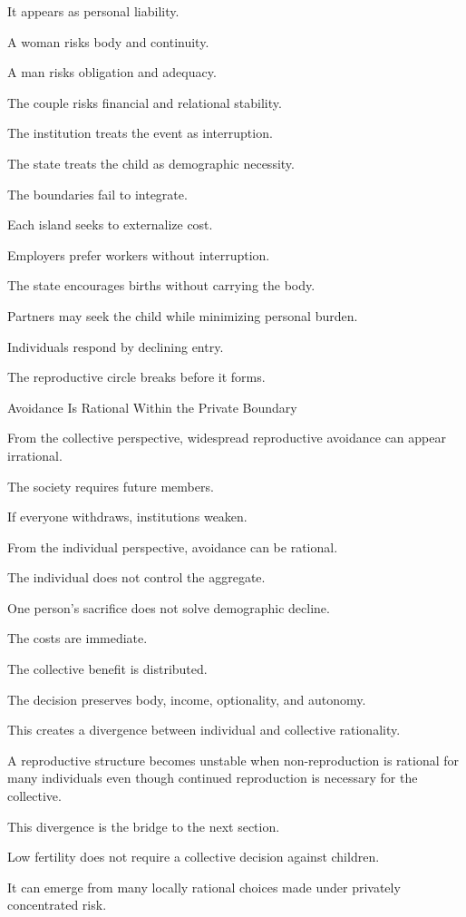 It appears as personal liability.

A woman risks body and continuity.

A man risks obligation and adequacy.

The couple risks financial and relational stability.

The institution treats the event as interruption.

The state treats the child as demographic necessity.

The boundaries fail to integrate.

Each island seeks to externalize cost.

Employers prefer workers without interruption.

The state encourages births without carrying the body.

Partners may seek the child while minimizing personal burden.

Individuals respond by declining entry.

The reproductive circle breaks before it forms.

Avoidance Is Rational Within the Private Boundary

From the collective perspective, widespread reproductive avoidance can appear irrational.

The society requires future members.

If everyone withdraws, institutions weaken.

From the individual perspective, avoidance can be rational.

The individual does not control the aggregate.

One person’s sacrifice does not solve demographic decline.

The costs are immediate.

The collective benefit is distributed.

The decision preserves body, income, optionality, and autonomy.

This creates a divergence between individual and collective rationality.

A reproductive structure becomes unstable when non-reproduction is rational for many individuals even though continued reproduction is necessary for the collective.

This divergence is the bridge to the next section.

Low fertility does not require a collective decision against children.

It can emerge from many locally rational choices made under privately concentrated risk.

